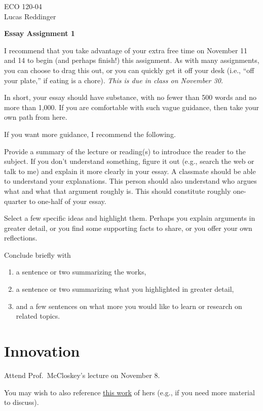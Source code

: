 \documentclass[
    letterpaper,paper=portrait,fleqn,
    DIV=16,fontsize=11pt,twoside=false,
    parskip=full-,
    headings=standardclasses]
{scrartcl}
\begin{document}
\RaggedRight
\thispagestyle{plain}

ECO 120-04 \\
Lucas Reddinger

\vspace{0.3\baselineskip}
\textbf{\LARGE Essay Assignment 1}
\vspace{0.2\baselineskip}

I recommend that you take advantage of your extra free time on November 11 and 14 to begin (and perhaps finish!) this assignment. As with many assignments, you can choose to drag this out, or you can quickly get it off your desk (i.e., ``off your plate,'' if eating is a chore). \emph{This is due in class on November 30.}

In short, your essay should have substance, with no fewer than 500 words and no more than 1,000. If you are comfortable with such vague guidance, then take your own path from here.

If you want more guidance, I recommend the following.

Provide a summary of the lecture or reading(s) to introduce the reader to the subject. If you don't understand something, figure it out (e.g., search the web or talk to me) and explain it more clearly in your essay. A classmate should be able to understand your explanations. This person should also understand who argues what and what that argument roughly is. This should constitute roughly one-quarter to one-half of your essay.

Select a few specific ideas and highlight them. Perhaps you explain arguments in greater detail, or you find some supporting facts to share, or you offer your own reflections.

Conclude briefly with
\begin{enumerate}
\item a sentence or two summarizing the works,
\item a sentence or two summarizing what you highlighted in greater detail,
\item and a few sentences on what more you would like to learn or research on related topics.
\end{enumerate}

\section{Innovation}

Attend Prof.~McCloskey's lecture on November 8.

You may wish to also reference \href{https://www.deirdremccloskey.com/docs/pdf/McCloskey_HowGrowthHappens.pdf}{this work} of hers (e.g., if you need more material to discuss).
\end{document}
